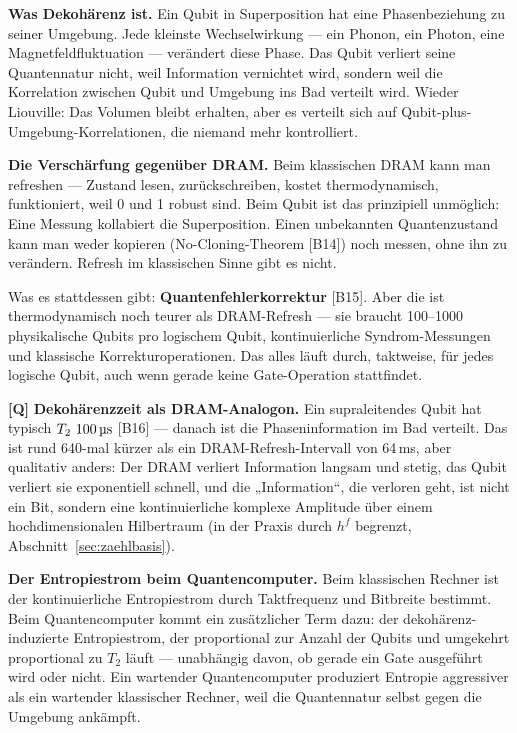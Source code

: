 \textbf{Was Dekohärenz ist.} Ein Qubit in Superposition hat eine Phasenbeziehung
zu seiner Umgebung. Jede kleinste Wechselwirkung --- ein Phonon, ein Photon, eine
Magnetfeldfluktuation --- verändert diese Phase. Das Qubit verliert seine
Quantennatur nicht, weil Information vernichtet wird, sondern weil die Korrelation
zwischen Qubit und Umgebung ins Bad verteilt wird. Wieder Liouville: Das Volumen
bleibt erhalten, aber es verteilt sich auf Qubit-plus-Umgebung-Korrelationen, die
niemand mehr kontrolliert.

\textbf{Die Verschärfung gegenüber DRAM.} Beim klassischen DRAM kann man
refreshen --- Zustand lesen, zurückschreiben, kostet thermodynamisch,
funktioniert, weil 0 und 1 robust sind. Beim Qubit ist das prinzipiell unmöglich:
Eine Messung kollabiert die Superposition. Einen unbekannten Quantenzustand kann
man weder kopieren (No-Cloning-Theorem [B14]) noch messen, ohne ihn zu verändern.
Refresh im klassischen Sinne gibt es nicht.

Was es stattdessen gibt: \textbf{Quantenfehlerkorrektur} [B15]. Aber die ist
thermodynamisch noch teurer als DRAM-Refresh --- sie braucht 100--1000
physikalische Qubits pro logischem Qubit, kontinuierliche Syndrom-Messungen und
klassische Korrekturoperationen. Das alles läuft durch, taktweise, für jedes
logische Qubit, auch wenn gerade keine Gate-Operation stattfindet.

\textbf{[Q]} \textbf{Dekohärenzzeit als DRAM-Analogon.} Ein supraleitendes Qubit hat
typisch $T_2 \sim 100\,\text{\textmu s}$ [B16] --- danach ist die
Phaseninformation im Bad verteilt. Das ist rund 640-mal kürzer als ein
DRAM-Refresh-Intervall von 64\,ms, aber qualitativ anders: Der DRAM verliert
Information langsam und stetig, das Qubit verliert sie exponentiell schnell, und
die „Information“, die verloren geht, ist nicht ein Bit, sondern eine
kontinuierliche komplexe Amplitude über einem hochdimensionalen Hilbertraum (in
der Praxis durch $h^f$ begrenzt, Abschnitt~\ref{sec:zaehlbasis}).

\textbf{Der Entropiestrom beim Quantencomputer.} Beim klassischen Rechner ist der
kontinuierliche Entropiestrom durch Taktfrequenz und Bitbreite bestimmt. Beim
Quantencomputer kommt ein zusätzlicher Term dazu: der dekohärenz-induzierte
Entropiestrom, der proportional zur Anzahl der Qubits und umgekehrt proportional
zu $T_2$ läuft --- unabhängig davon, ob gerade ein Gate ausgeführt wird oder
nicht. Ein wartender Quantencomputer produziert Entropie aggressiver als ein
wartender klassischer Rechner, weil die Quantennatur selbst gegen die Umgebung
ankämpft.

